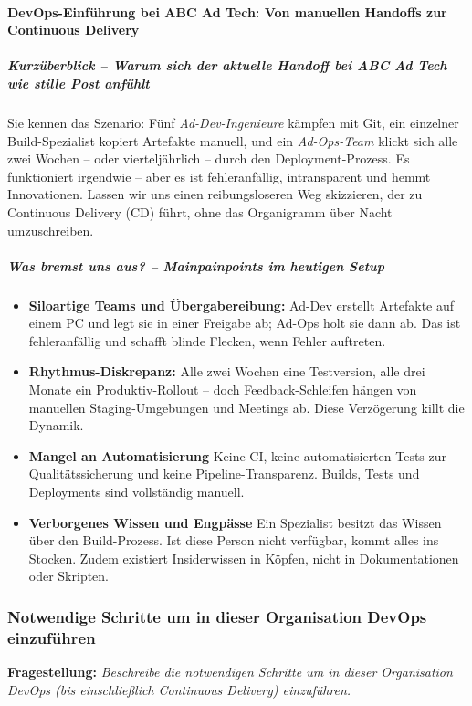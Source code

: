 \paragraph{DevOps-Einführung bei ABC Ad Tech: Von manuellen Handoffs zur Continuous Delivery}
\subparagraph{Kurzüberblick – Warum sich der aktuelle Handoff bei ABC Ad Tech wie stille Post anfühlt}
Sie kennen das Szenario: Fünf \textit{Ad-Dev-Ingenieure} kämpfen mit Git, ein einzelner Build-Spezialist kopiert Artefakte manuell,
und ein \textit{Ad-Ops-Team} klickt sich alle zwei Wochen – oder vierteljährlich – durch den Deployment-Prozess. Es funktioniert irgendwie – aber es ist fehleranfällig, intransparent und hemmt Innovationen. 
Lassen wir uns einen reibungsloseren Weg skizzieren, der zu Continuous Delivery (CD) führt, ohne das Organigramm über Nacht umzuschreiben.    
\subparagraph{Was bremst uns aus? – Mainpainpoints im heutigen Setup}
\begin{itemize}
    \item \textbf{Siloartige Teams und Übergabereibung:} Ad-Dev erstellt Artefakte auf einem PC und legt sie in einer Freigabe ab; Ad-Ops holt sie dann ab. Das ist fehleranfällig und schafft blinde Flecken, wenn Fehler auftreten.
    \item \textbf{Rhythmus-Diskrepanz:} Alle zwei Wochen eine Testversion, alle drei Monate ein Produktiv-Rollout – doch Feedback-Schleifen hängen von manuellen Staging-Umgebungen und Meetings ab. 
    Diese Verzögerung killt die Dynamik.
    \item \textbf{Mangel an Automatisierung} Keine CI, keine automatisierten Tests zur Qualitätssicherung und keine Pipeline-Transparenz. Builds, Tests und Deployments sind vollständig manuell.
    \item \textbf{Verborgenes Wissen und Engpässe} Ein Spezialist besitzt das Wissen über den Build-Prozess. Ist diese Person nicht verfügbar, kommt alles ins Stocken. Zudem existiert Insiderwissen in Köpfen, nicht in Dokumentationen oder Skripten.
\end{itemize}


\subsubsection{Notwendige Schritte um in dieser Organisation DevOps einzuführen}
\textbf{Fragestellung:} \textit{Beschreibe die notwendigen Schritte um in dieser Organisation DevOps (bis einschließlich
Continuous Delivery) einzuführen.}
